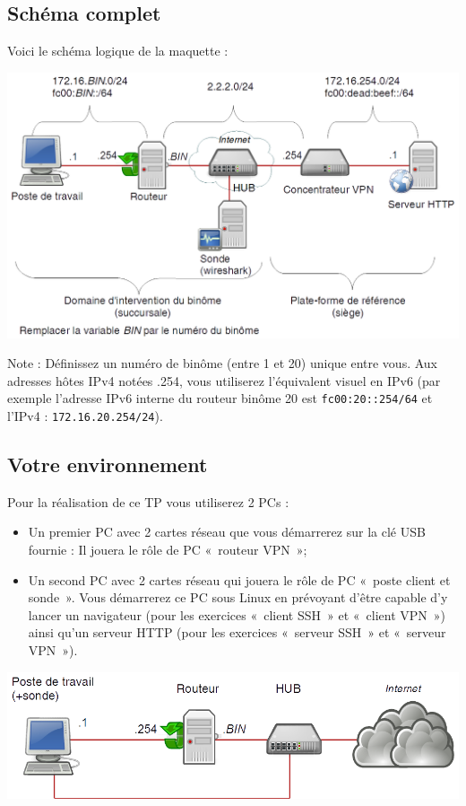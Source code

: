 \documentclass[a4paper,11pt]{article}
\newcommand{\shellcmd}[1]{\texttt{#1}}
\begin{document}
\subsection{Schéma complet}
Voici le schéma logique de la maquette :
\begin{center}
\includegraphics[width=0.9\linewidth]{schema-complet}
\end{center}

Note : Définissez un numéro de binôme (entre 1 et 20) unique entre vous. Aux adresses hôtes IPv4 notées .254, vous utiliserez l'équivalent visuel en IPv6 (par exemple l'adresse IPv6 interne du routeur binôme 20 est \shellcmd{fc00:20::254/64} et l'IPv4 : \shellcmd{172.16.20.254/24}).

\subsection{Votre environnement}
Pour la réalisation de ce TP vous utiliserez 2 PCs :
\begin{itemize}
\item Un premier PC avec 2 cartes réseau que vous démarrerez sur la clé USB fournie : Il jouera le rôle de PC «~routeur VPN~»;
\item Un second PC avec 2 cartes réseau qui jouera le rôle de PC «~poste client et sonde~». Vous démarrerez ce PC sous Linux en prévoyant d'être capable d'y lancer un navigateur (pour les exercices «~client SSH~» et «~client VPN~») ainsi qu'un serveur HTTP (pour les exercices «~serveur SSH~» et «~serveur VPN~»).
\end{itemize}
\begin{center}
\includegraphics[width=0.8\linewidth]{environnement}
\end{center}
\end{document}
